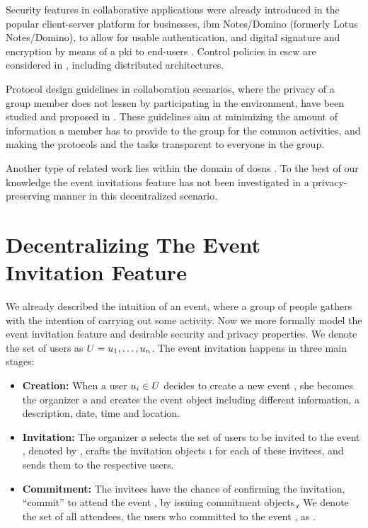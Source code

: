 Security features in collaborative applications were already introduced in the popular 
client-server platform for businesses, \acs*{ibm} Notes/Domino (formerly Lotus Notes/Domino), 
to allow for usable authentication, and digital signature and encryption by means 
of a \Ac{pki} to end-users \cite{Zurko05}. Control policies in \Ac{cscw} are considered 
in \cite{RoddenB91}, including distributed architectures.

Protocol design guidelines in collaboration scenarios, where the privacy 
of a group member does not lessen by participating in the 
environment, have been studied and proposed in \cite{KimK06a}. These guidelines aim 
at minimizing the amount of information a member has to provide to the group for 
the common activities, and making the protocols and 
the tasks transparent to everyone in the group.

Another type of related work lies within the domain of \Acp{dosn} \cite{BadenBSBS09,CutilloMS09,FamulariH12}. To the best of 
our knowledge the event invitations feature has not been investigated in a privacy-preserving 
manner in this decentralized scenario.

\section{Decentralizing The Event Invitation Feature}
	\label{section:event-invitations-dosns:decentralizing-the-event-invitation-feature}

We already described the intuition of   
an event, where a group of people gathers with the intention of carrying 
out some activity. Now we more formally model the event invitation
feature and desirable security and privacy properties. 
%
We denote the set of users as $U{} = u_1, \dots, u_n$. 
The event invitation happens in three main stages: 

\begin{itemize}
	
	\item \textbf{Creation:}
		When a user $\u[i] \in \U{}$ decides to create a new event \e{}, she becomes 
		the organizer \o{} and creates the event object \eo{} including different 
		information, \eg a description, date, time and location.
	
	\item \textbf{Invitation:}
		The organizer \o{} selects the set of users to be invited to the event \e{}, 
		denoted by \I{}, crafts the invitation objects \i{} for each of these invitees, 
		and sends them to the respective users. 
	
	\item \textbf{Commitment:}
		The invitees \I{} have the chance of confirming the invitation, \ie ``commit'' 
		to attend the event \e{}, by issuing commitment objects \c{}. We denote 
		the set of all attendees, \ie the users who committed to the event \e{},
		as \C{}.
	
\end{itemize}

